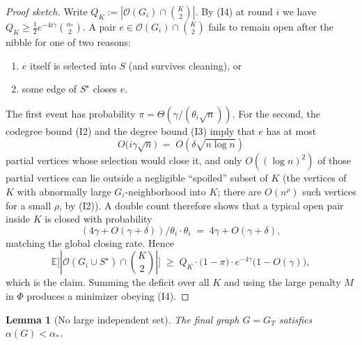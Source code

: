 \documentclass[11pt]{article}
\newtheorem{lemma}[theorem]{Lemma}
\theoremstyle{definition}
\newcommand{\cO}{\mathcal{O}}
\newcommand{\bin}[2]{\binom{#1}{#2}}
\begin{document}
\begin{proof}[Proof sketch]
Write $Q_K:=|\cO(G_i)\cap\bin{K}{2}|$.
By (I4) at round $i$ we have $Q_K\ge\tfrac12 e^{-4i\gamma}\bin{\alpha_{*}}{2}$.
A pair $e\in\cO(G_i)\cap\bin{K}{2}$ fails to remain open after the nibble for one of two reasons:
\begin{enumerate}
  \item $e$ itself is selected into $S$ (and survives cleaning), or
  \item some edge of $S^\star$ closes $e$.
\end{enumerate}
The first event has probability $\pi=\Theta(\gamma/(\theta_i\sqrt{n}))$.
For the second, the codegree bound (I2) and the degree bound (I3) imply that $e$ has at most
\[
  O\bigl(i\gamma\sqrt{n}\bigr)\;=\;O(\delta\sqrt{n\log n})
\]
partial vertices whose selection would close it, and only $O((\log n)^{2})$ of those partial vertices can lie outside a negligible ``spoiled'' subset of $K$ (the vertices of $K$ with abnormally large $G_i$-neighborhood into $K$; there are $O(n^{\rho})$ such vertices for a small $\rho$, by (I2)).
A double count therefore shows that a typical open pair inside $K$ is closed with probability
\[
  (4\gamma+O(\gamma+\delta))/\theta_i\cdot\theta_i \;=\; 4\gamma+O(\gamma+\delta),
\]
matching the global closing rate.
Hence
\[
  \mathbb{E}\bigl[|\cO(G_i\cup S^\star)\cap\bin{K}{2}|\bigr]
  \;\ge\;
  Q_K\cdot\bigl(1-\pi\bigr)\cdot e^{-4\gamma}\bigl(1-O(\gamma)\bigr),
\]
which is the claim.
Summing the deficit over all $K$ and using the large penalty $M$ in $\Phi$ produces a minimizer obeying (I4).
\end{proof}

\begin{lemma}[No large independent set]\label{lem:alpha}
The final graph $G=G_T$ satisfies $\alpha(G)<\alpha_{*}$.
\end{lemma}
\end{document}
